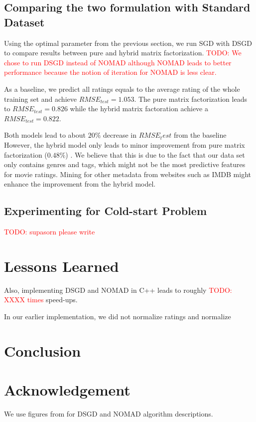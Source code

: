 \documentclass{article} %
\newcommand{\todo}[1]{\textcolor{red}{TODO: #1}}
\begin{document}
\subsection{Comparing the two formulation with Standard Dataset}

Using the optimal parameter from the previous section, we run SGD with DSGD to
compare results between pure and hybrid matrix factorization.  \todo{We chose to run DSGD instead of NOMAD although NOMAD leads to better performance because the
notion of iteration for NOMAD is less clear.}

As a baseline, we predict all ratings equals to the average rating of the whole training set and achieve $RMSE_{test}=1.053$. The pure matrix factorization leads to $RMSE_{test}=0.826$ while the hybrid matrix factoration achieve a $RMSE_{test}=0.822$.

Both models lead to about $20\%$ decrease in $RMSE_test$ from the baseline
However, the hybrid model only leads to minor improvement from pure matrix factorization ($0.48\%$) .  We believe that this is due
to the fact that our data set only contains genres and tags, which might not
be the most predictive features for movie ratings.  Mining for other metadata
from websites such as IMDB might enhance the improvement from the hybrid
model.

\subsection{Experimenting for Cold-start Problem}

\todo{supasorn please write}

\section{Lessons Learned}

Also, implementing DSGD and NOMAD in C++ leads to roughly \todo{XXXX times} speed-ups.

In our earlier implementation, we did not normalize ratings and normalize

\section{Conclusion}

\section{Acknowledgement}
We use figures from \cite{yun2013nomad} for DSGD and NOMAD algorithm descriptions.


{}
\end{document}
